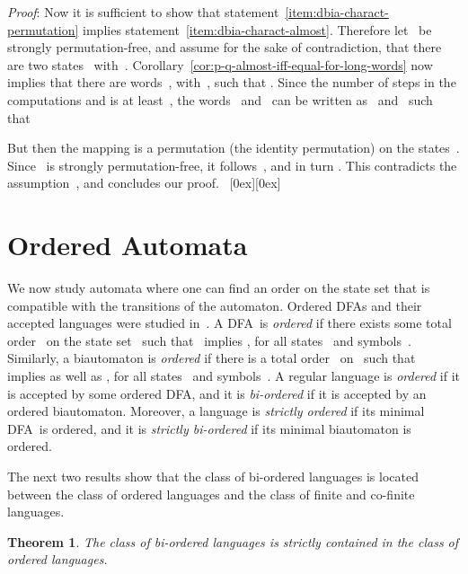\documentclass[submission]{eptcs}
\newcommand{\dfa}{\textrm{DFA}}
\newcommand*{\qed}{\raisebox{0.5ex}[0ex][0ex]{\framebox[1ex][l]{}}}
\newtheorem{theorem}{Theorem}
\newenvironment{proof}{\par\noindent
  {\rmfamily\itshape\mdseries Proof\/}:\hspace{\labelsep}\ignorespaces}{\mbox{}\nolinebreak\hfill~{\qed}
  \medbreak
}
\begin{document}
\begin{proof}
  Now it is sufficient to show that
  statement~\ref{item:dbia-charact-permutation} implies
  statement~\ref{item:dbia-charact-almost}.  Therefore let~ be
  strongly permutation-free, and assume for the sake of contradiction,
  that there are two states~ with~.
  Corollary~\ref{cor:p-q-almost-iff-equal-for-long-words} now implies
  that there are words~, with~, such that .
Since the number of steps in the computations 
  and  is at least~, the words~
  and~ can be written as~ and~ such that
  
  But then the mapping  is a
  permutation (the identity permutation) on the states~.
  Since~ is strongly permutation-free, it follows~, and in
  turn .  This contradicts the
  assumption~, and concludes our proof.
\end{proof}

\section{Ordered Automata}
\label{sec:ordered-automata}

We now study automata where one can find an order on the state set
that is compatible with the transitions of the automaton.  Ordered
\dfa s and their accepted languages were studied in~\cite{ShTh74}.  A
\dfa\  is \emph{ordered} if there exists
some total order~ on the state set~ such that~
implies , for all states~ and
symbols~.  Similarly, a biautomaton
 is \emph{ordered} if there is a total
order~ on~ such that~ implies  as well as , for all states~ and
symbols~.
A regular language is \emph{ordered} if it is accepted by some ordered
\dfa, and it is \emph{bi-ordered} if it is accepted by an ordered
biautomaton.  Moreover, a language is \emph{strictly ordered} if its
minimal \dfa\ is ordered, and it is \emph{strictly bi-ordered} if its
minimal biautomaton is ordered.

The next two results show that the class of bi-ordered languages is
located between the class of ordered languages and the class of finite
and co-finite languages.

\begin{theorem}\label{thm:bi-ordered-strictly-in-ordered}
  The class of bi-ordered languages is strictly contained in the class
  of ordered languages.  
\end{theorem}
\end{document}
